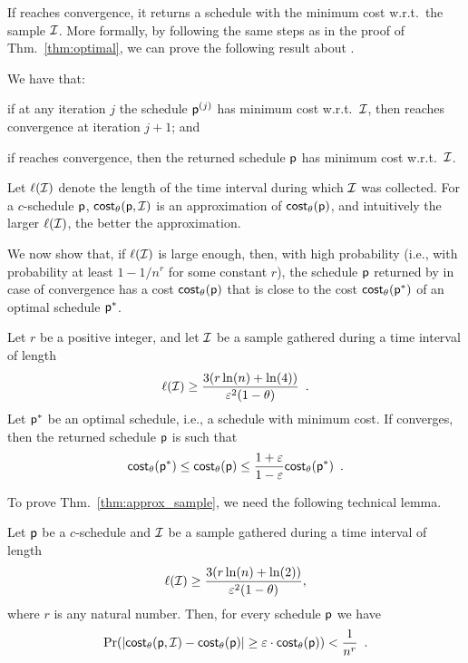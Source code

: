 If \algonameapx reaches convergence, it returns a schedule with the minimum cost
w.r.t.~the sample $\mathcal{I}$. More formally, by following the same steps as in
the proof of Thm.~\ref{thm:optimal}, we can prove the following result about
\algonameapx.

\begin{lemma}\label{lem:optimal_sample}
	We have that:
	\begin{enumerate*}
		\item if at any iteration $j$ the schedule $\mathsf{p}^{(j)}$ has minimum
			cost w.r.t.~$\mathcal{I}$, then \algonameapx reaches convergence at
			iteration $j+1$; and
		\item if \algonameapx reaches convergence, then the returned schedule
			$\mathsf{p}$ has minimum cost w.r.t.~$\mathcal{I}$.
	\end{enumerate*}
\end{lemma}

Let $\ell(\mathcal{I})$ denote the length of the time interval during which
$\mathcal{I}$ was collected. For a $c$-schedule $\mathsf{p}$,
$\mathsf{cost}_\theta(\mathsf{p},\mathcal{I})$ is an approximation of $\mathsf{cost}_\theta(\mathsf{p})$,
and intuitively the larger $\ell(\mathcal{I})$, the better the approximation.

We now show that, if $\ell(\mathcal{I})$ is large enough, then, with high
probability (i.e., with probability at least $1-1/n^r$ for some constant $r$),
the schedule $\mathsf{p}$ returned by \algonameapx in case of convergence has a cost
$\mathsf{cost}_\theta(\mathsf{p})$ that is close to the cost $\mathsf{cost}_\theta(\mathsf{p}^*)$ of an optimal
schedule $\mathsf{p}^*$.

\begin{theorem}\label{thm:approx_sample}
	Let $r$ be a positive integer, and let $\mathcal{I}$ be a sample gathered during a
	time interval of length
	\begin{equation}\label{eq:samplesize}
		\ell(\mathcal{I}) \geq
		\frac{3(r\ln(n)+\ln(4))}{\varepsilon^2(1-\theta)}\enspace.
	\end{equation}
	Let $\mathsf{p}^*$ be an optimal schedule, i.e., a schedule with minimum cost. If \algonameapx converges, then the returned schedule
	$\mathsf{p}$ is such that
	\[
		\mathsf{cost}_\theta(\mathsf{p}^*)\le\mathsf{cost}_\theta(\mathsf{p})\le\frac{1+\varepsilon}{1-\varepsilon}\mathsf{cost}_\theta(\mathsf{p}^*)\enspace.
	\]
\end{theorem}

To prove Thm.~\ref{thm:approx_sample}, we need the following technical lemma.

\begin{lemma}\label{lem:chernoffcost}
	Let $\mathsf{p}$ be a $c$-schedule and $\mathcal{I}$ be a sample gathered during a
	time interval of length
	\begin{align}\label{eq:samp_cond}
		\ell(\mathcal{I}) \geq \frac{3(r\ln(n)+\ln(2))}{\varepsilon^2(1-\theta)},
	\end{align}
	where $r$ is any natural number. Then, for every schedule $\mathsf{p}$ we have
	\[
		\Pr(|\mathsf{cost}_\theta(\mathsf{p},\mathcal{I}) - \mathsf{cost}_\theta(\mathsf{p})|\geq
		\varepsilon\cdot\mathsf{cost}_\theta(\mathsf{p})) < \frac{1}{n^r}\enspace .
	\]
\end{lemma}

